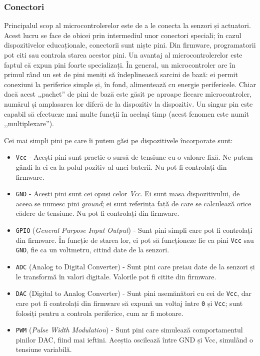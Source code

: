 \subsubsection{Conectori}
\label{sec:embed:micro-comp:micro:connect}

Principalul scop al microcontrolerelor este de a le conecta la senzori și actuatori.
Acest lucru se face de obicei prin intermediul unor conectori speciali;
în cazul dispozitivelor educaționale, conectorii sunt niște pini.
Din firmware, programatorii pot citi sau controla starea acestor pini.
Un avantaj al microcontrolerelor este faptul că expun pini foarte specializați.
În general, un microcontroler are în primul rând un set de pini meniți să îndeplinească sarcini de bază: ei permit conexiuni la periferice simple și, în fond, alimentează cu energie perifericele.
Chiar dacă acest ,,pachet'' de pini de bază este găsit pe aproape fiecare microcontroler, numărul și amplasarea lor diferă de la dispozitiv la dispozitiv.
Un singur pin este capabil să efectueze mai multe funcții în același timp (acest fenomen este numit ,,multiplexare'').

Cei mai simpli pini pe care îi putem găsi pe dispozitivele încorporate sunt:

\begin{itemize}
  \item \texttt{Vcc} - Acești pini sunt practic o sursă de tensiune cu o valoare fixă.
    Ne putem gândi la ei ca la polul pozitiv al unei baterii.
    Nu pot fi controlați din firmware.
  \item \texttt{GND} - Acești pini sunt cei opuși celor \textit{Vcc}.
    Ei sunt masa dispozitivului, de aceea se numesc pini \textit{ground};
    ei sunt referința față de care se calculează orice cădere de tensiune.
    Nu pot fi controlați din firmware.
  \item \texttt{GPIO}  (\textit{General Purpose Input Output}) - Sunt pini simpli care pot fi controlați din firmware.
    În funcție de starea lor, ei pot să funcționeze fie ca pini \texttt{Vcc} sau \texttt{GND}, fie ca un voltmetru, citind date de la senzori.
  \item \texttt{ADC}  (Analog to Digital Converter) - Sunt pini care preiau date de la senzori și le transformă în valori digitale.
    Valorile pot fi citite din firmware.
  \item \texttt{DAC}  (Digital to Analog Converter) - Sunt pini asemănători cu cei de \texttt{Vcc}, dar care pot fi controlați din firmware să expună un voltaj între \texttt{0} și \texttt{Vcc};
    sunt folosiți pentru a controla periferice, cum ar fi motoare.
  \item \texttt{PWM}  (\textit{Pulse Width Modulation}) - Sunt pini care simulează comportamentul pinilor DAC, fiind mai ieftini.
    Aceștia oscilează între GND și Vcc, simulând o tensiune variabilă.
\end{itemize}

